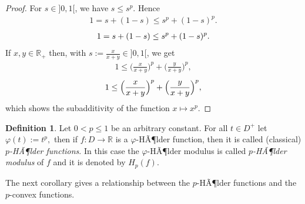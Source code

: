 \documentclass[12pt,leqno]{amsart}
\theoremstyle{definition}
\newtheorem{definition}[theorem]{Definition}
\newtheorem*{definition*}{Definition}
\begin{document}
\begin{proof} For $s\in ]0,1[$, we have $s\leq s^p.$ Hence
{\ifthenelse{\equal{{*}}{*}}
  {\begin{equation*}\begin{aligned}{
    1=s+(1-s)\leq s^p+(1-s)^p.
}\end{aligned}\end{equation*}}
  {\begin{equation}\begin{aligned}\label{E{*}}{
    1=s+(1-s)\leq s^p+(1-s)^p.
}\end{aligned}\end{equation}}}
If $x,y\in{\mathbb{R}}_+$ then, with $s:=\frac{x}{x+y}\in ]0,1[$, we get
{\ifthenelse{\equal{{*}}{*}}
  {\begin{equation*}\begin{aligned}{
  1\leq \Big(\frac{x}{x+y}\Big)^p+\Big(\frac{y}{x+y}\Big)^p,
}\end{aligned}\end{equation*}}
  {\begin{equation}\begin{aligned}\label{E{*}}{
  1\leq \Big(\frac{x}{x+y}\Big)^p+\Big(\frac{y}{x+y}\Big)^p,
}\end{aligned}\end{equation}}}
which shows the subadditivity of the function $x\mapsto x^p$.
\end{proof}

{
      {\begin{definition}\label{D{5}}{
Let $0<p\leq 1$ be an arbitrary constant.
For all $t\in D^+$ let $\varphi(t):=t^p,$ then if $f:D\to {\mathbb{R}}$ is a $\varphi$-HÃ¶lder function,
then it is called (classical) \textit{$p$-HÃ¶lder functions}.
In this case the $\varphi$-HÃ¶lder modulus is called \textit{$p$-HÃ¶lder modulus} of $f$
and it is denoted by ${H}_{p}(f)$.
}\end{definition}}}

The next corollary gives a relationship between the $p$-HÃ¶lder
functions and the $p$-convex functions.
\end{document}
